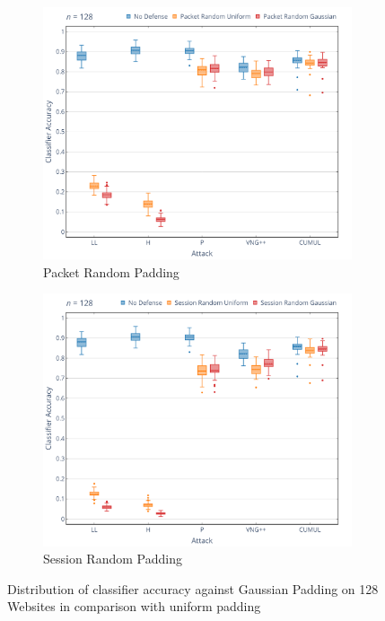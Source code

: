 \documentclass[
	ruledheaders=chapter,
	class=report,
	thesis={type=master, department=inf},
	accentcolor=1c,
	custommargins=true,
	marginpar=false,
	parskip=half-,
	fontsize=11pt,
]{tudapub}
\begin{document}
	\begin{figure}[tb]
		\begin{subfigure}{0.495\textwidth}
			\centering
			\includegraphics[width=\textwidth]{plots/significance_pkt.png}
			\caption{Packet Random Padding}
		\end{subfigure}
		\hfill
		\begin{subfigure}{0.495\textwidth}
			\centering
			\includegraphics[width=\textwidth]{plots/significance_ses.png}
			\caption{Session Random Padding}
		\end{subfigure}
		\caption[Distribution of classifier accuracy against Gaussian Padding on 128 Websites]{Distribution of classifier accuracy against Gaussian Padding on 128 Websites in comparison with uniform padding}
		\label{fig:performance_dist}
	\end{figure}
\end{document}

